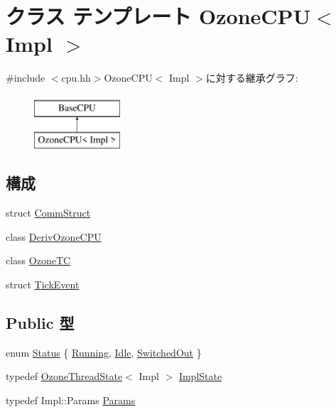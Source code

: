 \hypertarget{classOzoneCPU}{
\section{クラス テンプレート OzoneCPU$<$ Impl $>$}
\label{classOzoneCPU}
}


{\ttfamily \#include $<$cpu.hh$>$}OzoneCPU$<$ Impl $>$に対する継承グラフ:\begin{figure}[H]
\begin{center}
\leavevmode
\includegraphics[height=2cm]{classOzoneCPU}
\end{center}
\end{figure}
\subsection*{構成}
\begin{DoxyCompactItemize}
\item 
struct \hyperlink{structOzoneCPU_1_1CommStruct}{CommStruct}
\item 
class \hyperlink{classOzoneCPU_1_1DerivOzoneCPU}{DerivOzoneCPU}
\item 
class \hyperlink{classOzoneCPU_1_1OzoneTC}{OzoneTC}
\item 
struct \hyperlink{structOzoneCPU_1_1TickEvent}{TickEvent}
\end{DoxyCompactItemize}
\subsection*{Public 型}
\begin{DoxyCompactItemize}
\item 
enum \hyperlink{classOzoneCPU_a67a0db04d321a74b7e7fcfd3f1a3f70b}{Status} \{ \hyperlink{classOzoneCPU_a67a0db04d321a74b7e7fcfd3f1a3f70ba2f5f2c4a8c4f4f0519d503dcdfbf55cb}{Running}, 
\hyperlink{classOzoneCPU_a67a0db04d321a74b7e7fcfd3f1a3f70bad3fa9ae9431d6cb1772f9d9df48cab19}{Idle}, 
\hyperlink{classOzoneCPU_a67a0db04d321a74b7e7fcfd3f1a3f70ba2c25b24188e2b53c8706769167a82779}{SwitchedOut}
 \}
\item 
typedef \hyperlink{structOzoneThreadState}{OzoneThreadState}$<$ Impl $>$ \hyperlink{classOzoneCPU_ad0869a9831e79c51005b1444fa0a9127}{ImplState}
\item 
typedef Impl::Params \hyperlink{classOzoneCPU_a818e103eae798a24a06a0a34631849ea}{Params}
\end{DoxyCompactItemize}
